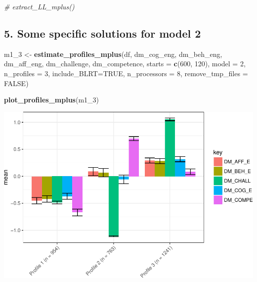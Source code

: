 \documentclass[]{msu-thesis}
\newenvironment{Shaded}{\begin{snugshade}}{\end{snugshade}}
\newcommand{\KeywordTok}[1]{\textcolor[rgb]{0.13,0.29,0.53}{\textbf{#1}}}
\newcommand{\DataTypeTok}[1]{\textcolor[rgb]{0.13,0.29,0.53}{#1}}
\newcommand{\DecValTok}[1]{\textcolor[rgb]{0.00,0.00,0.81}{#1}}
\newcommand{\StringTok}[1]{\textcolor[rgb]{0.31,0.60,0.02}{#1}}
\newcommand{\CommentTok}[1]{\textcolor[rgb]{0.56,0.35,0.01}{\textit{#1}}}
\newcommand{\OtherTok}[1]{\textcolor[rgb]{0.56,0.35,0.01}{#1}}
\newcommand{\NormalTok}[1]{#1}
\theoremstyle{definition}
\theoremstyle{definition}
\theoremstyle{definition}
\theoremstyle{remark}
\begin{document}
\begin{Shaded}
\begin{Highlighting}[]
\CommentTok{# extract_LL_mplus()}
\end{Highlighting}
\end{Shaded}

\subsection{5. Some specific solutions for model
2}\label{some-specific-solutions-for-model-2}

\begin{Shaded}
\begin{Highlighting}[]
\NormalTok{m1_}\DecValTok{3}\NormalTok{ <-}\StringTok{ }\KeywordTok{estimate_profiles_mplus}\NormalTok{(df,  }
\NormalTok{                             dm_cog_eng, dm_beh_eng, dm_aff_eng, dm_challenge, dm_competence,}
                             \DataTypeTok{starts =} \KeywordTok{c}\NormalTok{(}\DecValTok{600}\NormalTok{, }\DecValTok{120}\NormalTok{),}
                             \DataTypeTok{model =} \DecValTok{2}\NormalTok{,}
                             \DataTypeTok{n_profiles =} \DecValTok{3}\NormalTok{,}
                             \DataTypeTok{include_BLRT=}\OtherTok{TRUE}\NormalTok{,}
                             \DataTypeTok{n_processors =} \DecValTok{8}\NormalTok{, }\DataTypeTok{remove_tmp_files =} \OtherTok{FALSE}\NormalTok{)}

\KeywordTok{plot_profiles_mplus}\NormalTok{(m1_}\DecValTok{3}\NormalTok{)}
\end{Highlighting}
\end{Shaded}

\includegraphics{rosenberg-dissertation_files/figure-latex/spec-solutions-model2-3-1.pdf}
\end{document}
